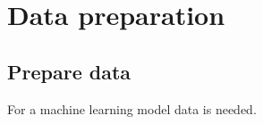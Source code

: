 \chapter{Data preparation}\label{sec:data-prep}

\section{Prepare data}
For a machine learning model data is needed.

